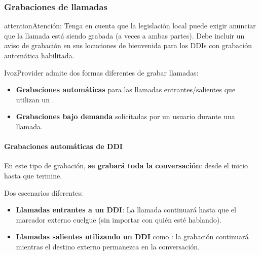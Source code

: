 \documentclass[letterpaper,10pt,spanish]{sphinxmanual}
\begin{document}
\subsubsection{Grabaciones de llamadas}
\label{administration_portal/client/residential/calls/call_recordings::doc}\label{administration_portal/client/residential/calls/call_recordings:call-recordings}
\begin{notice}{attention}{Atención:}
Tenga en cuenta que la legislación local puede exigir anunciar que la llamada está siendo grabada (a veces a ambas partes). Debe incluir un aviso de grabación en sus locuciones de bienvenida para los DDIs con grabación automática habilitada.
\end{notice}

IvozProvider admite dos formas diferentes de grabar llamadas:
\begin{itemize}
\item {} 
\textbf{Grabaciones automáticas} para las llamadas entrantes/salientes que utilizan un {\hyperref[administration_portal/brand/views/ddis:ddis]{}}.

\item {} 
\textbf{Grabaciones bajo demanda} solicitadas por un usuario durante una llamada.

\end{itemize}


\paragraph{Grabaciones automáticas de DDI}
\label{administration_portal/client/residential/calls/call_recordings:automatic-ddi-recordings}
En este tipo de grabación, \textbf{se grabará toda la conversación}: desde el inicio hasta que termine.

Dos escenarios diferentes:
\begin{itemize}
\item {} 
\textbf{Llamadas entrantes a un DDI}: La llamada continuará hasta que el marcador externo cuelgue (sin importar con quién esté hablando).

\item {} 
\textbf{Llamadas salientes utilizando un DDI} como {\hyperref[administration_portal/brand/views/ddis:ddis]{}}: la grabación continuará mientras el destino externo permanezca en la conversación.

\end{itemize}
\end{document}
